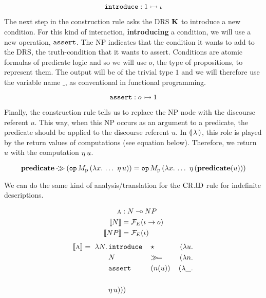 $$
\mathtt{introduce} : 1 \rightarrowtail \iota
$$

The next step in the construction rule asks the DRS $\mathbf{K}$ to introduce a
new condition. For this kind of interaction, \textbf{introducing} a
condition, we will use a new operation, $\mathtt{assert}$. The NP indicates
that the condition it wants to add to the DRS, the truth-condition that it
wants to assert. Conditions are atomic formulas of predicate logic and so
we will use $o$, the type of propositions, to represent them. The output
will be of the trivial type $1$ and we will therefore use the variable name
$\_$, as conventional in functional programming.

$$
\mathtt{assert} : o \rightarrowtail 1
$$

Finally, the construction rule tells us to replace the NP node with the
discourse referent $u$. This way, when this NP occurs as an argument to a
predicate, the predicate should be applied to the discourse referent
$u$. In $\llparenthesis \, \lambda \, \rrparenthesis$, this role is played by the return values of
computations (see equation below). Therefore, we return $u$ with the
computation $\eta\,u$.

$$
\textbf{predicate} \mathbin{\cdot\!\!\gg} (\mathtt{op}\,M_{\mathrm{p}}\,(\lambda x.\,  \ldots\
    \eta\,u)) = \mathtt{op}\,M_{\mathrm{p}}\,(\lambda x.\,  \ldots\
    \eta\,(\textbf{predicate}(u)))
$$

We can do the same kind of analysis/translation for the $\mathrm{CR.ID}$ rule for
indefinite descriptions.

\vspace{6mm}

\hspace{-10mm}
\begin{minipage}{0.72\textwidth}
\cridbox
\end{minipage}
\begin{minipage}{0.27\textwidth}
\vspace{0.3cm}
\begin{align*}
\textsc{a} &: N \mathbin{{-}\mkern-3.5mu{\circ}} NP \\
\llbracket N \rrbracket &= \mathcal{F}_E(\iota \to o) \\
\llbracket NP \rrbracket &= \mathcal{F}_E(\iota)
\end{align*}
\begin{align*}
\llbracket \textsc{a} \rrbracket =\ \lambda N.\, & \mathtt{introduce}\,&&\star\, &(\lambda u.\,  \\
                         & N &&\mathbin{\gg\!=} &(\lambda n.\,  \\
                         & \mathtt{assert}\,&&(n(u))\, &(\lambda \_.\,  \\
                         \\
                         & \eta\,u)))
\end{align*}
\end{minipage}

